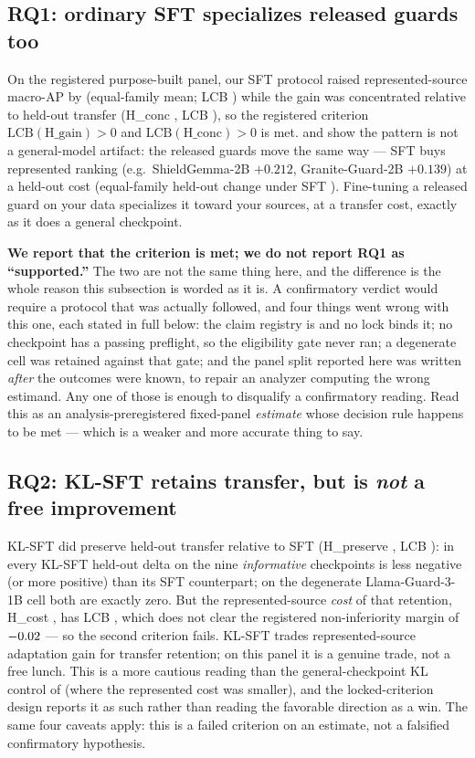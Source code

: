 \subsection{RQ1: ordinary SFT specializes released guards too}
\label{sec:adaptation-rq1}
\noindent
On the registered purpose-built panel, our SFT protocol raised represented-source macro-AP by
\AdaHGain{} (equal-family mean; LCB \AdaHGainLCB) while the gain was concentrated relative to held-out
transfer (H\_conc \AdaHConc, LCB \AdaHConcLCB), so the registered criterion
$\text{LCB}(\text{H\_gain})>0$ and $\text{LCB}(\text{H\_conc})>0$ is met.
 and  show the pattern is not a general-model
artifact: the released guards move the same way --- SFT buys represented ranking (e.g.\ ShieldGemma-2B
$+0.212$, Granite-Guard-2B $+0.139$) at a held-out cost (equal-family held-out change under SFT
\AdaHheldSFT). Fine-tuning a released guard on your data specializes it toward your sources, at a
transfer cost, exactly as it does a general checkpoint.

\textbf{We report that the criterion is met; we do not report RQ1 as ``supported.''} The two are not
the same thing here, and the difference is the whole reason this subsection is worded as it is. A
confirmatory verdict would require a protocol that was actually followed, and four things went wrong
with this one, each stated in full below: the claim registry is  and no lock binds
it; no checkpoint has a passing preflight, so the eligibility gate never ran; a degenerate cell was
retained against that gate; and the panel split reported here was written \emph{after} the outcomes were
known, to repair an analyzer computing the wrong estimand. Any one of those is enough to disqualify a
confirmatory reading. Read this as an analysis-preregistered fixed-panel \emph{estimate} whose decision
rule happens to be met --- which is a weaker and more accurate thing to say.

\subsection{RQ2: KL-SFT retains transfer, but is \emph{not} a free improvement}
\label{sec:adaptation-rq2}
\noindent
KL-SFT did preserve held-out transfer relative to SFT (H\_preserve \AdaHPreserve, LCB \AdaHPreserveLCB):
in  every KL-SFT held-out delta on the nine \emph{informative} checkpoints is less
negative (or more positive) than its SFT counterpart; on the degenerate Llama-Guard-3-1B cell both are
exactly zero. But the represented-source \emph{cost} of that retention, H\_cost \AdaHCost, has
LCB \AdaHCostLCB, which does not clear the registered non-inferiority margin of $-0.02$ --- so
the second criterion fails. KL-SFT trades represented-source adaptation
gain for transfer retention; on this panel it is a genuine trade, not a free lunch. This is a more
cautious reading than the general-checkpoint KL control of  (where the represented
cost was smaller), and the locked-criterion design reports it as such rather than reading the favorable
direction as a win. The same four caveats apply: this is a failed criterion on an estimate, not a
falsified confirmatory hypothesis.

